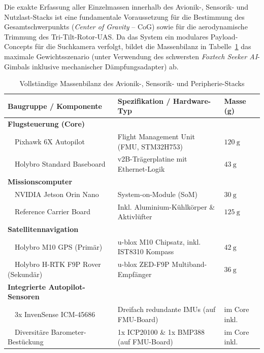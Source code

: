 Die exakte Erfassung aller Einzelmassen innerhalb des Avionik-, Sensorik- und Nutzlast-Stacks ist eine fundamentale Voraussetzung für die Bestimmung des Gesamtschwerpunkts (\textit{Center of Gravity} -- CoG) sowie für die aerodynamische Trimmung des Tri-Tilt-Rotor-UAS. Da das System ein modulares Payload-Concepts für die Suchkamera verfolgt, bildet die Massenbilanz in Tabelle~\ref{tab:avionics_mass_balance} das maximale Gewichtsszenario (unter Verwendung des schwersten \textit{Foxtech Seeker AI}-Gimbals inklusive mechanischer Dämpfungsadapter) ab.

\vspace{0.2cm}

\begin{longtable}{p{6.0cm} p{5.0cm} p{2.5cm}}
    \caption{Vollständige Massenbilanz des Avionik-, Sensorik- und Peripherie-Stacks} \label{tab:avionics_mass_balance} \\
    \toprule
    \textbf{Baugruppe / Komponente} & \textbf{Spezifikation / Hardware-Typ} & \textbf{Masse (g)} \\
    \midrule
    \endhead %
    
    \bottomrule
    \endfoot %
    
    \textbf{Flugsteuerung (Core)} & & \\
    ~~Pixhawk 6X Autopilot & Flight Management Unit (FMU, STM32H753) & $\SI{120}{\g}$ \\
    ~~Holybro Standard Baseboard & v2B-Trägerplatine mit Ethernet-Logik & $\SI{43}{\g}$ \\
    \midrule
    
    \textbf{Missionscomputer} & & \\
    ~~NVIDIA Jetson Orin Nano & System-on-Module (SoM) & $\SI{30}{\g}$ \\
    ~~Reference Carrier Board & Inkl. Aluminium-Kühlkörper \& Aktivlüfter & $\SI{125}{\g}$ \\
    \midrule
    
    \textbf{Satellitennavigation} & & \\
    ~~Holybro M10 GPS (Primär) & u-blox M10 Chipsatz, inkl. IST8310 Kompass & $\SI{42}{\g}$ \\
    ~~Holybro H-RTK F9P Rover (Sekundär) & u-blox ZED-F9P Multiband-Empfänger & $\SI{36}{\g}$ \\
    \midrule
    
    \textbf{Integrierte Autopilot-Sensoren} & & \\
    ~~3x InvenSense ICM-45686 & Dreifach redundante IMUs (auf FMU-Board) & im Core inkl. \\
    ~~Diversitäre Barometer-Bestückung & 1x ICP20100 \& 1x BMP388 (auf FMU-Board) & im Core inkl. \\
    \midrule
    

\end{longtable}
